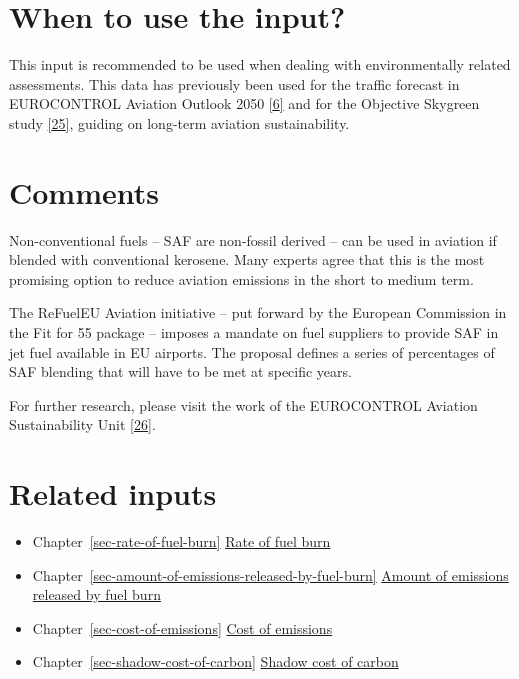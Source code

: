 \documentclass[
  11pt,
  a4paper,
]{book}
\providecommand{\tightlist}{%
  \setlength{\itemsep}{0pt}\setlength{\parskip}{0pt}}\usepackage{longtable,booktabs,array}
\begin{document}
\hypertarget{when-to-use-the-input-5}{%
\section{When to use the input?}\label{when-to-use-the-input-5}}

This input is recommended to be used when dealing with environmentally
related assessments. This data has previously been used for the traffic
forecast in EUROCONTROL Aviation Outlook 2050
\protect\hyperlink{ref-aviation:outlook2022}{{[}6{]}} and for the
Objective Skygreen study \protect\hyperlink{ref-skygreen2022}{{[}25{]}},
guiding on long-term aviation sustainability.

\hypertarget{comments-3}{%
\section{Comments}\label{comments-3}}

Non-conventional fuels -- SAF are non-fossil derived -- can be used in
aviation if blended with conventional kerosene. Many experts agree that
this is the most promising option to reduce aviation emissions in the
short to medium term.

The ReFuelEU Aviation initiative -- put forward by the European
Commission in the Fit for 55 package -- imposes a mandate on fuel
suppliers to provide SAF in jet fuel available in EU airports. The
proposal defines a series of percentages of SAF blending that will have
to be met at specific years.

For further research, please visit the work of the EUROCONTROL Aviation
Sustainability Unit \protect\hyperlink{ref-ectl:asu}{{[}26{]}}.

\hypertarget{related-inputs-8}{%
\section{Related inputs}\label{related-inputs-8}}

\begin{itemize}
\tightlist
\item
  Chapter~\ref{sec-rate-of-fuel-burn}
  \protect\hyperlink{sec-rate-of-fuel-burn}{Rate of fuel burn}
\item
  Chapter~\ref{sec-amount-of-emissions-released-by-fuel-burn}
  \protect\hyperlink{sec-amount-of-emissions-released-by-fuel-burn}{Amount
  of emissions released by fuel burn}
\item
  Chapter~\ref{sec-cost-of-emissions}
  \protect\hyperlink{sec-cost-of-emissions}{Cost of emissions}
\item
  Chapter~\ref{sec-shadow-cost-of-carbon}
  \protect\hyperlink{sec-shadow-cost-of-carbon}{Shadow cost of carbon}
\end{itemize}
\end{document}
